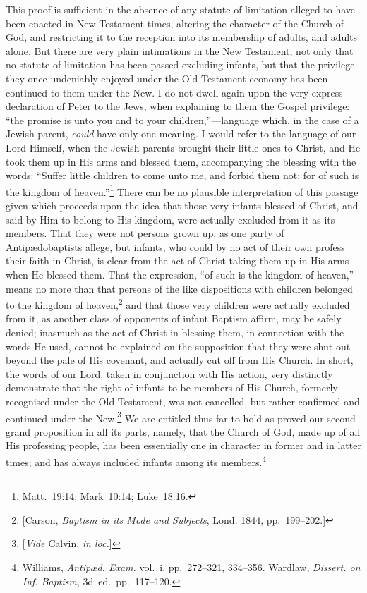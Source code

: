 \documentclass[
  english,
]{book}
\begin{document}
This proof is sufficient in the absence of any statute of limitation alleged to have been enacted in New Testament times, altering the character of the Church of God, and restricting it to the reception into its membership of adults, and adults alone. But there are very plain intimations in the New Testament, not only that no statute of limitation has been passed excluding infants, but that the privilege they once undeniably enjoyed under the Old Testament economy has been continued to them under the New. I do not dwell again upon the very express declaration of Peter to the Jews, when explaining to them the Gospel privilege: ``the promise is unto you and to your children,''---language which, in the case of a Jewish parent, \emph{could} have only one meaning. I would refer to the language of our Lord Himself, when the Jewish parents brought their little ones to Christ, and He took them up in His arms and blessed them, accompanying the blessing with the words: ``Suffer little children to come unto me, and forbid them not; for of such is the kingdom of heaven.''\footnote{Matt.~19:14; Mark~10:14; Luke~18:16.} There can be no plausible interpretation of this passage given which proceeds upon the idea that those very infants blessed of Christ, and said by Him to belong to His kingdom, were actually excluded from it as its members. That they were not persons grown up, as one party of Antipædobaptists allege, but infants, who could by no act of their own profess their faith in Christ, is clear from the act of Christ taking them up in His arms when He blessed them. That the expression, ``of such is the kingdom of heaven,'' means no more than that persons of the like dispositions with children belonged to the kingdom of heaven,\footnote{{[}Carson, \emph{Baptism in its Mode and Subjects}, Lond. 1844, pp.~199--202.{]}} and that those very children were actually excluded from it, as another class of opponents of infant Baptism affirm, may be safely denied; inasmuch as the act of Christ in blessing them, in connection with the words He used, cannot be explained on the supposition that they were shut out beyond the pale of His covenant, and actually cut off from His Church. In short, the words of our Lord, taken in conjunction with His action, very distinctly demonstrate that the right of infants to be members of His Church, formerly recognised under the Old Testament, was not cancelled, but rather confirmed and continued under the New.\footnote{{[}\emph{Vide} Calvin, \emph{in loc.}{]}} We are entitled thus far to hold as proved our second grand proposition in all its parts, namely, that the Church of God, made up of all His professing people, has been essentially one in character in former and in latter times; and has always included infants among its members.\footnote{Williams, \emph{Antipæd. Exam.} vol.~i. pp.~272--321, 334--356. Wardlaw, \emph{Dissert. on Inf. Baptism}, 3d~ed.~pp.~117--120.}
\end{document}
